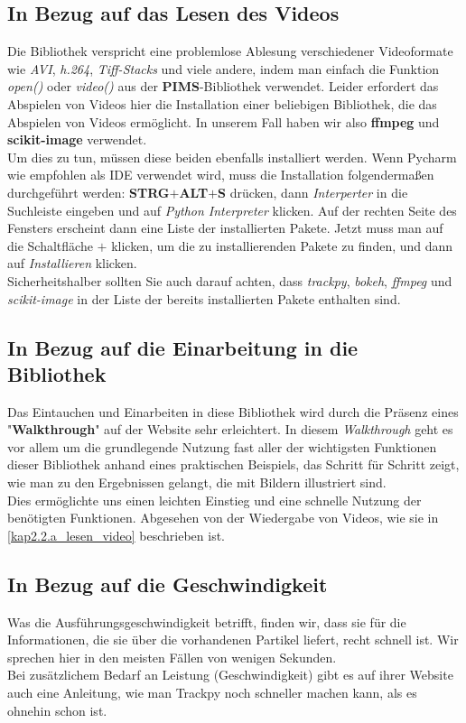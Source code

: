 \subsection{In Bezug auf das Lesen des Videos \label{kap2.2.a_lesen_video}}
Die Bibliothek verspricht eine problemlose Ablesung verschiedener Videoformate wie \textit{AVI}, \textit{h.264}, \textit{Tiff-Stacks} und viele andere, indem man einfach die Funktion \textit{open()} oder \textit{video()} aus der \textbf{PIMS}-Bibliothek \cite{pims} verwendet. Leider erfordert das Abspielen von Videos hier die Installation einer beliebigen Bibliothek, die das Abspielen von Videos ermöglicht. In unserem Fall haben wir also \textbf{ffmpeg} und \textbf{scikit-image} verwendet.\\
Um dies zu tun, müssen diese beiden ebenfalls installiert werden. Wenn Pycharm wie empfohlen als IDE verwendet wird, muss die Installation folgendermaßen durchgeführt werden:  \textbf{STRG$+$ALT$+$S} drücken, dann \textit{Interperter} in die Suchleiste eingeben und  auf \textit{Python Interpreter} klicken. 
Auf der rechten Seite des Fensters erscheint dann eine Liste der installierten Pakete. Jetzt muss man auf die Schaltfläche $+$ klicken, um die zu installierenden Pakete zu finden, und dann auf \textit{Installieren} klicken.\\
Sicherheitshalber sollten Sie auch darauf achten, dass \textit{trackpy}, \textit{bokeh}, \textit{ffmpeg} und \textit{scikit-image} in der Liste der bereits installierten Pakete enthalten sind. 

\subsection{In Bezug auf die Einarbeitung in die Bibliothek \label{kap2.2.b_einarbeitung}}

Das Eintauchen und Einarbeiten in diese Bibliothek wird durch die Präsenz eines "\textbf{Walkthrough}" auf der Website sehr erleichtert.  In diesem \textit{Walkthrough} geht es vor allem um die grundlegende Nutzung fast aller der wichtigsten Funktionen dieser Bibliothek anhand eines praktischen Beispiels, das Schritt für Schritt zeigt, wie man zu den Ergebnissen gelangt, die mit Bildern illustriert sind.\\
Dies ermöglichte uns einen leichten Einstieg und eine schnelle Nutzung der benötigten Funktionen. Abgesehen von der Wiedergabe von Videos, wie sie in \ref{kap2.2.a_lesen_video} beschrieben ist.


\subsection{In Bezug auf die Geschwindigkeit \label{kap2.2.c_geschwindigkeit}}
Was die Ausführungsgeschwindigkeit betrifft, finden wir, dass sie für die Informationen, die sie über die vorhandenen Partikel liefert, recht schnell ist.  Wir sprechen hier in den meisten Fällen von wenigen Sekunden. \\
Bei zusätzlichem Bedarf an Leistung (Geschwindigkeit) gibt es auf ihrer Website auch eine Anleitung, wie man Trackpy noch schneller machen kann, als es ohnehin schon ist.
